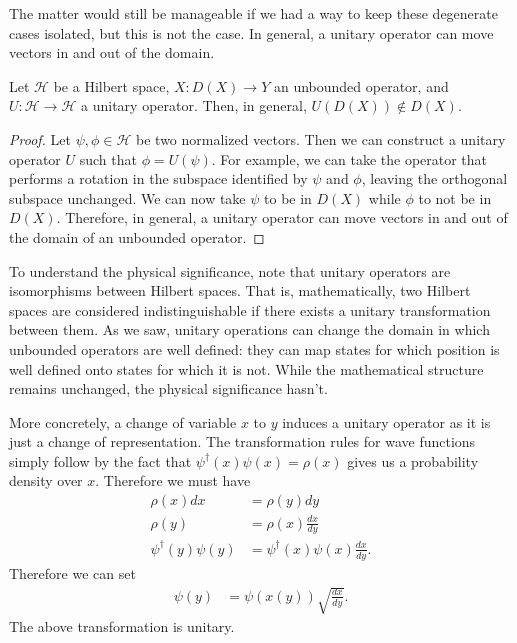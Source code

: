 \documentclass[10pt,twocolumn, nofootinbib]{revtex4-2}
\begin{document}
The matter would still be manageable if we had a way to keep these degenerate cases isolated, but this is not the case. In general, a unitary operator can move vectors in and out of the domain.
\begin{prop}
Let $\mathcal{H}$ be a Hilbert space, $X : D(X) \to Y$ an unbounded operator, and $U : \mathcal{H} \to \mathcal{H}$ a unitary operator. Then, in general, $U(D(X)) \notin D(X)$.
\end{prop}
\begin{proof}
Let $\psi, \phi \in \mathcal{H}$ be two normalized vectors. Then we can construct a unitary operator $U$ such that $\phi = U(\psi)$. For example, we can take the operator that performs a rotation in the subspace identified by $\psi$ and $\phi$, leaving the orthogonal subspace unchanged. We can now take $\psi$ to be in $D(X)$ while $\phi$ to not be in $D(X)$. Therefore, in general, a unitary operator can move vectors in and out of the domain of an unbounded operator.
\end{proof}

To understand the physical significance, note that unitary operators are isomorphisms between Hilbert spaces. That is, mathematically, two Hilbert spaces are considered indistinguishable if there exists a unitary transformation between them. As we saw, unitary operations can change the domain in which unbounded operators are well defined: they can map states for which position is well defined onto states for which it is not. While the mathematical structure remains unchanged, the physical significance hasn't.

More concretely, a change of variable $x$ to $y$ induces a unitary operator as it is just a change of representation. The transformation rules for wave functions simply follow by the fact that $\psi^\dagger(x) \psi(x) = \rho(x)$ gives us a probability density over $x$. Therefore we must have
\begin{equation}
	\begin{aligned}
		\rho(x) dx &= \rho(y) dy \\
		\rho(y) &= \rho(x) \frac{dx}{dy} \\
		\psi^\dagger(y) \psi(y) &= \psi^\dagger(x) \psi(x) \frac{dx}{dy}.
	\end{aligned}
\end{equation}
Therefore we can set 
\begin{equation}
	\begin{aligned}
		\psi(y) &= \psi(x(y)) \sqrt{\frac{dx}{dy}}.
	\end{aligned}
\end{equation}
The above transformation is unitary.
\end{document}
